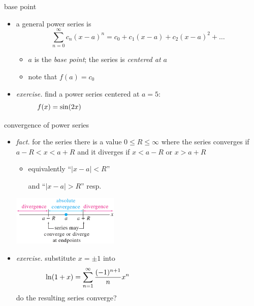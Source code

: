 \documentclass[urlcolor=blue,dvipsnames]{beamer}
\begin{document}
\begin{frame}{base point}

\begin{itemize}
\item a general power series is
    $$\sum_{n=0}^\infty c_n (x-a)^n = c_0 + c_1 (x-a) + c_2 (x-a)^2 + \dots$$
    \begin{itemize}
    \item $a$ is the \emph{base point}; the series is \emph{centered at $a$}
    \item note that $f(a)=c_0$
    \end{itemize}
\item \emph{exercise.}  find a power series centered at $a=5$:
    $$f(x) = \sin(2x) \hspace{80mm}$$

\vspace{30mm}
\end{itemize}
\end{frame}


\begin{frame}{convergence of power series}

\begin{itemize}
\item \emph{fact.} for the series
there is a value $0 \le R \le \infty$ where the series converges if $a-R < x < a+R$ and it diverges if $x<a-R$ or $x>a+R$
    \begin{itemize}
    \item equivalently ``$|x-a|<R$''
    
     and ``$|x-a|>R$'' resp.
    \end{itemize}

\vspace{-10mm}

\hfill \includegraphics[width=0.4\textwidth]{figs/convergediverge}

\vspace{-10mm}
\item \emph{exercise.} substitute $x=\pm1$ into
   $$\ln(1+x) = \sum_{n=1}^\infty \frac{(-1)^{n+1}}{n} x^n \hspace{50mm}$$
do the resulting series converge?

\vspace{25mm}
\end{itemize}
\end{frame}
\end{document}
